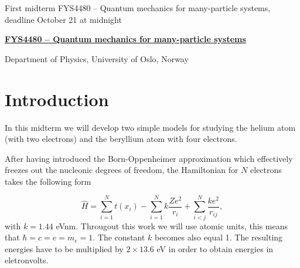 \documentclass[a4,10pt]{article}
\begin{document}

\newcommand{\exercisesection}[1]{\subsection*{#1}}






\thispagestyle{empty}

\begin{center}
{\LARGE\bf
\begin{spacing}{1.25}
First midterm FYS4480 – Quantum mechanics for many-particle systems, deadline October 21 at midnight
\end{spacing}
}
\end{center}


\begin{center}
{\bf \href{{http://www.uio.no/studier/emner/matnat/fys/FYS4480/index-eng.html}}{FYS4480 – Quantum mechanics for many-particle systems}}
\end{center}

    \begin{center}
\centerline{{\small Department of Physics, University of Oslo, Norway}}
\end{center}

\section*{Introduction}

In this midterm we will develop two simple models for studying the 
helium atom (with two electrons) and the beryllium atom with four electrons.

After having introduced the  Born-Oppenheimer approximation which effectively freezes out the nucleonic degrees
of freedom, the Hamiltonian for $N$ electrons takes the following form

\begin{equation*}
  \hat{H} = \sum_{i=1}^{N} t(x_i) 
  - \sum_{i=1}^{N} k\frac{Ze^2}{r_i} + \sum_{i<j}^{N} \frac{ke^2}{r_{ij}},
\end{equation*}
with $k=1.44$ eVnm. Througout this work we will use atomic units, this means
that $\hbar=c=e=m_e=1$. The constant $k$ becomes also equal 1. 
The resulting energies have to be multiplied by $2\times 13.6$ eV
in order to obtain energies in eletronvolts.
\end{document}
